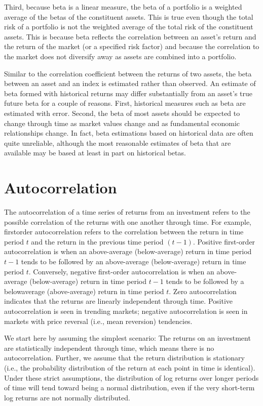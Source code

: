 \documentclass[11pt]{article}
\begin{document}
Third, because beta is a linear measure, the beta of a portfolio is a weighted average of the betas of the constituent assets. This is true even though the total risk of a portfolio is not the weighted average of the total risk of the constituent assets. This is because beta reflects the correlation between an asset's return and the return of the market (or a specified risk factor) and because the correlation to the market does not diversify away as assets are combined into a portfolio.

Similar to the correlation coefficient between the returns of two assets, the beta between an asset and an index is estimated rather than observed. An estimate of beta formed with historical returns may differ substantially from an asset's true future beta for a couple of reasons. First, historical measures such as beta are estimated with error. Second, the beta of most assets should be expected to change through time as market values change and as fundamental economic relationships change. In fact, beta estimations based on historical data are often quite unreliable, although the most reasonable estimates of beta that are available may be based at least in part on historical betas.

\section*{Autocorrelation}
The autocorrelation of a time series of returns from an investment refers to the possible correlation of the returns with one another through time. For example, firstorder autocorrelation refers to the correlation between the return in time period $t$ and the return in the previous time period $(t-1)$. Positive first-order autocorrelation is when an above-average (below-average) return in time period $t-1$ tends to be followed by an above-average (below-average) return in time period $t$. Conversely, negative first-order autocorrelation is when an above-average (below-average) return in time period $t-1$ tends to be followed by a belowaverage (above-average) return in time period $t$. Zero autocorrelation indicates that the returns are linearly independent through time. Positive autocorrelation is seen in trending markets; negative autocorrelation is seen in markets with price reversal (i.e., mean reversion) tendencies.

We start here by assuming the simplest scenario: The returns on an investment are statistically independent through time, which means there is no autocorrelation. Further, we assume that the return distribution is stationary (i.e., the probability distribution of the return at each point in time is identical). Under these strict assumptions, the distribution of log returns over longer periods of time will tend toward being a normal distribution, even if the very short-term log returns are not normally distributed.
\end{document}
